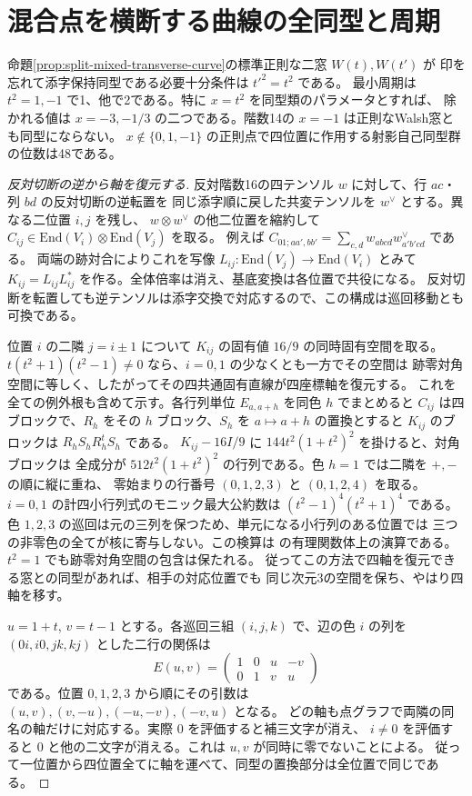 \section{混合点を横断する曲線の全同型と周期}
\label{sec:marked-mixed-curve-isomorphisms}
\begin{theorem}\label{thm:marked-mixed-curve-isomorphisms}
命題\ref{prop:split-mixed-transverse-curve}の標準正則な二窓 $W(t),W(t')$ が
印を忘れて添字保持同型である必要十分条件は $t'^2=t^2$ である。
最小周期は $t^2=1,-1$ で1、他で2である。特に $x=t^2$ を同型類のパラメータとすれば、
除かれる値は $x=-3,-1/3$ の二つである。階数14の $x=-1$ は正則なWalsh窓とも同型にならない。
$x\notin\{0,1,-1\}$ の正則点で四位置に作用する射影自己同型群の位数は48である。
\end{theorem}

\begin{proof}[反対切断の逆から軸を復元する]
反対階数16の四テンソル $w$ に対して、行 $ac$・列 $bd$ の反対切断の逆転置を
同じ添字順に戻した共変テンソルを $w^\vee$ とする。異なる二位置 $i,j$ を残し、
$w\otimes w^\vee$ の他二位置を縮約して
$C_{ij}\in\mathrm{End}(V_i)\otimes\mathrm{End}(V_j)$ を取る。
例えば $C_{01;aa',bb'}=\sum_{c,d}w_{abcd}w^\vee_{a'b'cd}$ である。
両端の跡対合によりこれを写像 $L_{ij}:\mathrm{End}(V_j)\to\mathrm{End}(V_i)$ とみて
$K_{ij}=L_{ij}L_{ij}^*$ を作る。全体倍率は消え、基底変換は各位置で共役になる。
反対切断を転置しても逆テンソルは添字交換で対応するので、この構成は巡回移動とも可換である。

位置 $i$ の二隣 $j=i\pm1$ について $K_{ij}$ の固有値 $16/9$ の同時固有空間を取る。
$t(t^2+1)(t^2-1)\ne0$ なら、$i=0,1$ の少なくとも一方でその空間は
跡零対角空間に等しく、したがってその四共通固有直線が四座標軸を復元する。
これを全ての例外根も含めて示す。各行列単位 $E_{a,a+h}$ を同色 $h$ でまとめると
$C_{ij}$ は四ブロックで、$R_h$ をその $h$ ブロック、$S_h$ を $a\mapsto a+h$ の置換とすると
$K_{ij}$ のブロックは $R_h S_h R_h^t S_h$ である。
$K_{ij}-16I/9$ に $144t^2(1+t^2)^2$ を掛けると、対角ブロックは
全成分が $512t^2(1+t^2)^2$ の行列である。色 $h=1$ では二隣を $+,-$ の順に縦に重ね、
零始まりの行番号 $(0,1,2,3)$ と $(0,1,2,4)$ を取る。
$i=0,1$ の計四小行列式のモニック最大公約数は $(t^2-1)^4(t^2+1)^4$ である。
色 $1,2,3$ の巡回は元の三列を保つため、単元になる小行列のある位置では
三つの非零色の全てが核に寄与しない。この検算は
の有理関数体上の演算である。
$t^2=1$ でも跡零対角空間の包含は保たれる。
従ってこの方法で四軸を復元できる窓との同型があれば、相手の対応位置でも
同じ次元3の空間を保ち、やはり四軸を移す。

$u=1+t$, $v=t-1$ とする。各巡回三組 $(i,j,k)$ で、辺の色 $i$ の列を
$(0i,i0,jk,kj)$ とした二行の関係は
\[
 E(u,v)=\begin{pmatrix}1&0&u&-v\\0&1&v&u\end{pmatrix}
\]
である。位置 $0,1,2,3$ から順にその引数は $(u,v),(v,-u),(-u,-v),(-v,u)$ となる。
どの軸も点グラフで両隣の同名の軸だけに対応する。実際 $0$ を評価すると補三文字が消え、
$i\ne0$ を評価すると $0$ と他の二文字が消える。これは $u,v$ が同時に零でないことによる。
従って一位置から四位置全てに軸を運べて、同型の置換部分は全位置で同じである。
\end{proof}

